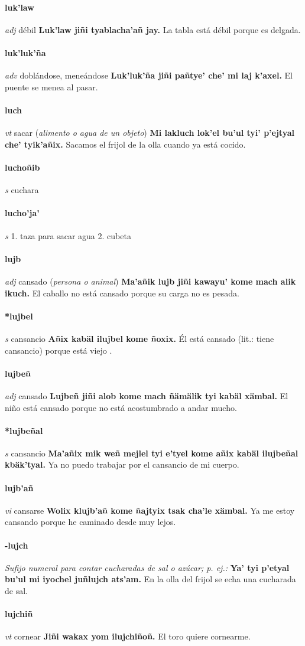\documentclass{scrbook}
\newcommand{\entry}[1]{\paragraph{#1}}
\newcommand{\onedefinition}[1]{#1.}
\newcommand{\nontranslationdef}[1]{\textit{#1}}
\newcommand{\partofspeech}[1]{\textit{#1}}
\newcommand{\spanishtranslation}[1]{#1}
\newcommand{\clarification}[1]{(\textit{#1})}
\newcommand{\cholexample}[1]{\textbf{#1}}
\newcommand{\exampletranslation}[1]{#1}
\begin{document}
\begin{multicols}{2}
\entry{luk'law}
\partofspeech{adj}
\spanishtranslation{débil}
\cholexample{Luk'law jiñi tyablacha'añ jay.}
\exampletranslation{La tabla está débil porque es delgada.}

\entry{luk'luk'ña}
\partofspeech{adv}
\spanishtranslation{doblándose, meneándose}
\cholexample{Luk'luk'ña jiñi pañtye' che' mi laj k'axel.}
\exampletranslation{El puente se menea al pasar.}

\entry{luch}
\partofspeech{vt}
\spanishtranslation{sacar}
\clarification{alimento o agua de un objeto}
\cholexample{Mi lakluch lok'el bu'ul tyi' p'ejtyal che' tyik'añix.}
\exampletranslation{Sacamos el frijol de la olla cuando ya está cocido.}

\entry{luchoñib}
\partofspeech{s}
\spanishtranslation{cuchara}

\entry{lucho'ja'}
\partofspeech{s}
\onedefinition{1}
\spanishtranslation{taza para sacar agua}
\onedefinition{2}
\spanishtranslation{cubeta}

\entry{lujb}
\partofspeech{adj}
\spanishtranslation{cansado}
\clarification{persona o animal}
\cholexample{Ma'añik lujb jiñi kawayu' kome mach alik ikuch.}
\exampletranslation{El caballo no está cansado porque su carga no es pesada.}

\entry{*lujbel}
\partofspeech{s}
\spanishtranslation{cansancio}
\cholexample{Añix kabäl ilujbel kome ñoxix.}
\exampletranslation{Él está cansado (lit.: tiene cansancio) porque está viejo .}

\entry{lujbeñ}
\partofspeech{adj}
\spanishtranslation{cansado}
\cholexample{Lujbeñ jiñi alob kome mach ñämälik tyi kabäl xämbal.}
\exampletranslation{El niño está cansado porque no está acostumbrado a andar mucho.}

\entry{*lujbeñal}
\partofspeech{s}
\spanishtranslation{cansancio}
\cholexample{Ma'añix mik weñ mejlel tyi e'tyel kome añix kabäl ilujbeñal kbäk'tyal.}
\exampletranslation{Ya no puedo trabajar por el cansancio de mi cuerpo.}

\entry{lujb'añ}
\partofspeech{vi}
\spanishtranslation{cansarse}
\cholexample{Wolix klujb'añ kome ñajtyix tsak cha'le xämbal.}
\exampletranslation{Ya me estoy cansando porque he caminado desde muy lejos.}

\entry{-lujch}
\nontranslationdef{Sufijo numeral para contar cucharadas de sal o azúcar; p. ej.:}
\cholexample{Ya' tyi p'etyal bu'ul mi iyochel juñlujch ats'am.}
\exampletranslation{En la olla del frijol se echa una cucharada de sal.}

\entry{lujchiñ}
\partofspeech{vt}
\spanishtranslation{cornear}
\cholexample{Jiñi wakax yom ilujchiñoñ.}
\exampletranslation{El toro quiere cornearme.}


\end{multicols}
\end{document}
